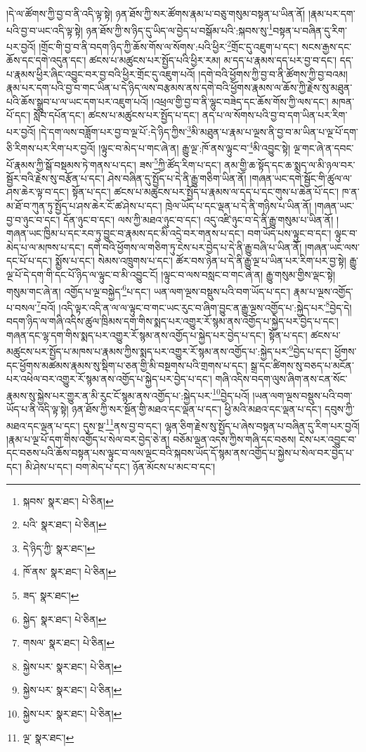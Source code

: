 །དེ་ལ་ཚོགས་ཀྱི་བྱ་བ་ནི་འདི་ལྟ་སྟེ། ཉན་ཐོས་ཀྱི་སར་ཚོགས་རྣམ་པ་བཅུ་གསུམ་བསྟན་པ་ཡིན་ནོ། །རྣམ་པར་དག་པའི་བྱ་བ་ཡང་འདི་ལྟ་སྟེ། ཉན་ཐོས་ཀྱི་ས་ཉིད་དུ་ཡིད་ལ་བྱེད་པ་བསྒོམ་པའི་:སྐབས་སུ་\footnote{སྐབས་  སྣར་ཐང་།  པེ་ཅིན། }བསྟན་པ་བཞིན་དུ་རིག་པར་བྱའོ། །གྲོང་གི་བྱ་བ་ནི་བདག་ཉིད་ཀྱི་ཆོས་གོས་ལ་སོགས་:པའི་ཕྱིར་\footnote{པའི་  སྣར་ཐང་།  པེ་ཅིན། }གྲོང་དུ་འཇུག་པ་དང་། སངས་རྒྱས་དང་ཆོས་དང་དགེ་འདུན་དང་། ཚངས་པ་མཚུངས་པར་སྤྱོད་པའི་ཕྱིར་རམ། མ་དད་པ་རྣམས་དད་པར་བྱ་བ་དང་། དད་པ་རྣམས་ཕྱིར་ཞིང་འབྱུང་བར་བྱ་བའི་ཕྱིར་གྲོང་དུ་འཇུག་པའོ། །དགེ་བའི་ཕྱོགས་ཀྱི་བྱ་བ་ནི་ཚོགས་ཀྱི་བྱ་བའམ། རྣམ་པར་དག་པའི་བྱ་བ་གང་ཡིན་པ་དེ་ཉིད་ལས་བརྩམས་ནས་དགེ་བའི་ཕྱོགས་རྣམས་ལ་ཆོས་ཀྱི་རྗེས་སུ་མཐུན་པའི་ཆོས་སྒྲུབ་པ་ལ་ཡང་དག་པར་འཇུག་པའོ། །འཕྲལ་གྱི་བྱ་བ་ནི་ལྷུང་བཟེད་དང་ཆོས་གོས་ཀྱི་ལས་དང་། མཁན་པོ་དང་། སློབ་དཔོན་དང་། ཚངས་པ་མཚུངས་པར་སྤྱོད་པ་དང་། ནད་པ་ལ་སོགས་པའི་བྱ་བ་དག་ཡིན་པར་རིག་པར་བྱའོ། །དེ་དག་ལས་བཟློག་པར་བྱ་བ་ལྔ་པོ་:དེ་ཉིད་ཀྱིས་\footnote{དེ་ཉིད་ཀྱི་  སྣར་ཐང་། }མི་མཐུན་པ་རྣམ་པ་ལྔས་ནི་བྱ་བ་མ་ཡིན་པ་ལྔ་པོ་དག་ཅི་རིགས་པར་རིག་པར་བྱའོ། །ལྟུང་བ་མེད་པ་གང་ཞེ་ན། རྒྱུ་ལྔ་:ཁོ་ནས་ལྟུང་བ་\footnote{ཁོ་ནས་  སྣར་ཐང་།  པེ་ཅིན། }མི་འབྱུང་སྟེ། ལྔ་གང་ཞེ་ན་དབང་པོ་རྣམས་ཀྱི་སྒོ་བསྡམས་ཏེ་གནས་པ་དང་། ཟས་\footnote{ཟད་  སྣར་ཐང་། }ཀྱི་ཚོད་རིག་པ་དང་། ནམ་གྱི་ཆ་སྟོད་དང་ཆ་སྨད་ལ་མི་ཉལ་བར་སྦྱོར་བའི་རྗེས་སུ་བརྩོན་པ་དང་། ཤེས་བཞིན་དུ་སྤྱོད་པ་དེ་ནི་རྒྱུ་གཅིག་ཡིན་ནོ། །གཞན་ཡང་དགེ་སྦྱོང་གི་ཚུལ་ལ་ཤས་ཆེར་ལྟ་བ་དང་། སྟོན་པ་དང་། ཚངས་པ་མཚུངས་པར་སྤྱོད་པ་རྣམས་ལ་དད་པ་དང་གུས་པ་ཆེན་པོ་དང་། ཁ་ན་མ་ཐོ་བ་ཀུན་ཏུ་སྤྱོད་པ་ཤས་ཆེར་ངོ་ཚ་ཤེས་པ་དང་། ཁྲེལ་ཡོད་པ་དང་ལྡན་པ་དེ་ནི་གཉིས་པ་ཡིན་ནོ། །གཞན་ཡང་བྱ་བ་ཉུང་བ་དང་། དོན་ཉུང་བ་དང་། ལས་ཀྱི་མཐའ་ཉུང་བ་དང་། འདུ་འཛི་ཉུང་བ་དེ་ནི་རྒྱུ་གསུམ་པ་ཡིན་ནོ། །གཞན་ཡང་ཁྱིམ་པ་དང་རབ་ཏུ་བྱུང་བ་རྣམས་དང་མི་འདྲེ་བར་གནས་པ་དང་། བག་ཡོད་པས་ལྟུང་བ་དང་། ལྟུང་བ་མེད་པ་ལ་མཁས་པ་དང་། དགེ་བའི་ཕྱོགས་ལ་གཅིག་ཏུ་ངེས་པར་བྱེད་པ་དེ་ནི་རྒྱུ་བཞི་པ་ཡིན་ནོ། །གཞན་ཡང་ལས་དང་པོ་པ་དང་། སྨྱོས་པ་དང་། སེམས་འཁྲུགས་པ་དང་། ཚོར་བས་ཉེན་པ་དེ་ནི་རྒྱུ་ལྔ་པ་ཡིན་པར་རིག་པར་བྱ་སྟེ། རྒྱུ་ལྔ་པོ་དེ་དག་གི་དང་པོ་ཉིད་ལ་ལྟུང་བ་མི་འབྱུང་ངོ། །ལྟུང་བ་ལས་བསླང་བ་གང་ཞེ་ན། རྒྱུ་གསུམ་གྱིས་ལྡང་སྟེ། གསུམ་གང་ཞེ་ན། འགྱོད་པ་ལྔ་བསྐྱེད་\footnote{སྐྱེད་  སྣར་ཐང་།  པེ་ཅིན། }པ་དང་། ཡན་ལག་ལྔས་བསྡུས་པའི་བག་ཡོད་པ་དང་། རྣམ་པ་ལྔས་འགྱོད་པ་བསལ་\footnote{གསལ་  སྣར་ཐང་།  པེ་ཅིན། }བའོ། །འདི་ལྟར་འདི་ན་ལ་ལ་ལྟུང་བ་གང་ཡང་རུང་བ་ཞིག་བྱུང་ན་རྒྱུ་ལྔས་འགྱོད་པ་:སྐྱེད་པར་\footnote{སྐྱེས་པར་  སྣར་ཐང་།  པེ་ཅིན། }བྱེད་དེ། བདག་ཉིད་ལ་གཞི་འདིས་ཚུལ་ཁྲིམས་དག་གིས་སྨད་པར་འགྱུར་རོ་སྙམ་ནས་འགྱོད་པ་སྐྱེད་པར་བྱེད་པ་དང་། གཞན་དང་ལྷ་དག་གིས་སྨད་པར་འགྱུར་རོ་སྙམ་ནས་འགྱོད་པ་སྐྱེད་པར་བྱེད་པ་དང་། སྟོན་པ་དང་། ཚངས་པ་མཚུངས་པར་སྤྱོད་པ་མཁས་པ་རྣམས་ཀྱིས་སྨད་པར་འགྱུར་རོ་སྙམ་ནས་འགྱོད་པ་:སྐྱེད་པར་\footnote{སྐྱེས་པར་  སྣར་ཐང་།  པེ་ཅིན། }བྱེད་པ་དང་། ཕྱོགས་དང་ཕྱོགས་མཚམས་རྣམས་སུ་སྡིག་པ་ཅན་གྱི་མི་བསྔགས་པའི་གྲགས་པ་དང་། སྒྲ་དང་ཚིགས་སུ་བཅད་པ་མངོན་པར་འཕེལ་བར་འགྱུར་རོ་སྙམ་ནས་འགྱོད་པ་སྐྱེད་པར་བྱེད་པ་དང་། གཞི་འདིས་བདག་ལུས་ཞིག་ནས་ངན་སོང་རྣམས་སུ་སྐྱེས་པར་གྱུར་ན་མི་རུང་ངོ་སྙམ་ནས་འགྱོད་པ་:སྐྱེད་པར་\footnote{སྐྱེས་པར་  སྣར་ཐང་།  པེ་ཅིན། }བྱེད་པའོ། །ཡན་ལག་ལྔས་བསྡུས་པའི་བག་ཡོད་པ་ནི་འདི་ལྟ་སྟེ། ཉན་ཐོས་ཀྱི་སར་སྔོན་གྱི་མཐའ་དང་ལྡན་པ་དང་། ཕྱི་མའི་མཐའ་དང་ལྡན་པ་དང་། དབུས་ཀྱི་མཐའ་དང་ལྡན་པ་དང་། དུས་སྔ་\footnote{ལྔ་  སྣར་ཐང་། }ནས་བྱ་བ་དང་། ལྷན་ཅིག་རྗེས་སུ་སྤྱོད་པ་ཞེས་བསྟན་པ་བཞིན་དུ་རིག་པར་བྱའོ། །རྣམ་པ་ལྔ་པོ་དག་གིས་འགྱོད་པ་སེལ་བར་བྱེད་ཅེ་ན། བཅོམ་ལྡན་འདས་ཀྱིས་གཞི་དང་བཅས། ངེས་པར་འབྱུང་བ་དང་བཅས་པའི་ཆོས་བསྟན་པས་ལྟུང་བ་ལས་ལྡང་བའི་སྐབས་ཡོད་དོ་སྙམ་ནས་འགྱོད་པ་སྐྱེས་པ་སེལ་བར་བྱེད་པ་དང་། མི་ཤེས་པ་དང་། བག་མེད་པ་དང་། ཉོན་མོངས་པ་མང་བ་དང་། 